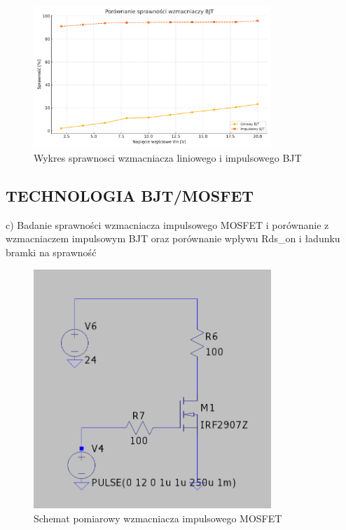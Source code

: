 \documentclass[11pt]{article}
\begin{document}
\begin{figure}[H]
\centering
\includegraphics[width=0.8\textwidth]{aun1_liniowy_impulsowy_bjt.pdf}
\caption{Wykres sprawnosci wzmacniacza liniowego i impulsowego BJT}
\end{figure}


\subsection{TECHNOLOGIA BJT/MOSFET}

c) Badanie sprawności wzmacniacza impulsowego MOSFET i porównanie z wzmacniaczem impulsowym BJT oraz porównanie wpływu Rds_on i ładunku bramki na sprawność

\begin{figure}[H]
\centering
\includegraphics[width=0.8\textwidth]{aun1_impulsowy_mosfet.png}
\caption{Schemat pomiarowy wzmacniacza impulsowego MOSFET}
\end{figure}
\end{document}
